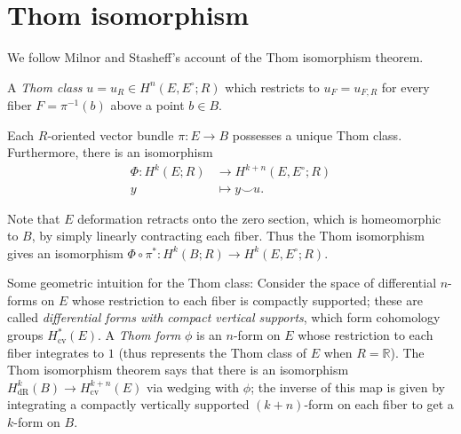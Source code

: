 \documentclass[10pt]{article}
\providecommand{\RR}{\mathbb R}
\providecommand{\dg}{^\circ}
\providecommand{\inv}{^{-1}}
\providecommand{\vocab}[1]{{{\sffamily\textit{#1}}}}
\begin{document}
\section{Thom isomorphism}
We follow Milnor and Stasheff's account of the Thom isomorphism theorem.

\begin{definition}
    \label{def:thom-class}
    A \vocab{Thom class} $u = u_R\in H^n(E,E\dg; R)$
    which restricts to $u_F = u_{F, R}$ for every fiber
    $F = \pi\inv(b)$ above a point $b\in B$.
\end{definition}

\begin{theorem}
    \label{thm:thom-isomorphism}
    Each $ R$-oriented vector bundle $\pi\colon E\to B$
    possesses a unique Thom class. Furthermore, there is an isomorphism
    \begin{align*}
	\Phi\colon H^k(E; R)&\to H^{k+n}(E,E\dg; R)\\
	y&\mapsto y\smile u.
    \end{align*}
\end{theorem}

Note that $E$ deformation retracts onto the zero section,
which is homeomorphic to $B$, by simply linearly contracting each fiber.
Thus the Thom isomorphism gives an isomorphism
$\Phi\circ\pi^*\colon H^k(B; R)\to H^k(E,E\dg; R)$.

Some geometric intuition for the Thom class:
Consider the space of differential $n$-forms on $E$
whose restriction to each fiber is compactly supported;
these are called \vocab{differential forms with compact vertical supports},
which form cohomology groups $H^*_{\text{cv}}(E)$.
A \vocab{Thom form} $\phi$ is an $n$-form on $E$
whose restriction to each fiber integrates to $1$
(thus represents the Thom class of $E$ when $ R = \RR$).
The Thom isomorphism theorem says that there is an isomorphism
$H_{\text{dR}}^k(B)\to H^{k+n}_{\text{cv}}(E)$
via wedging with $\phi$; the inverse of this map
is given by integrating a compactly vertically supported $(k+n)$-form
on each fiber to get a $k$-form on $B$.

% 
\end{document}
